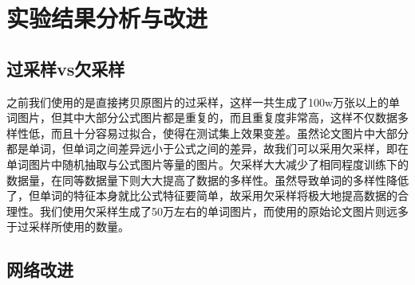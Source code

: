 \chapter{实验结果分析与改进}

\section{过采样vs欠采样}

之前我们使用的是直接拷贝原图片的过采样，这样一共生成了100w万张以上的单词图片，但其中大部分公式图片都是重复的，而且重复度非常高，这样不仅数据多样性低，而且十分容易过拟合，使得在测试集上效果变差。虽然论文图片中大部分都是单词，但单词之间差异远小于公式之间的差异，故我们可以采用欠采样，即在单词图片中随机抽取与公式图片等量的图片。欠采样大大减少了相同程度训练下的数据量，在同等数据量下则大大提高了数据的多样性。虽然导致单词的多样性降低了，但单词的特征本身就比公式特征要简单，故采用欠采样将极大地提高数据的合理性。我们使用欠采样生成了50万左右的单词图片，而使用的原始论文图片则远多于过采样所使用的数量。

\section{网络改进}
\noindent

